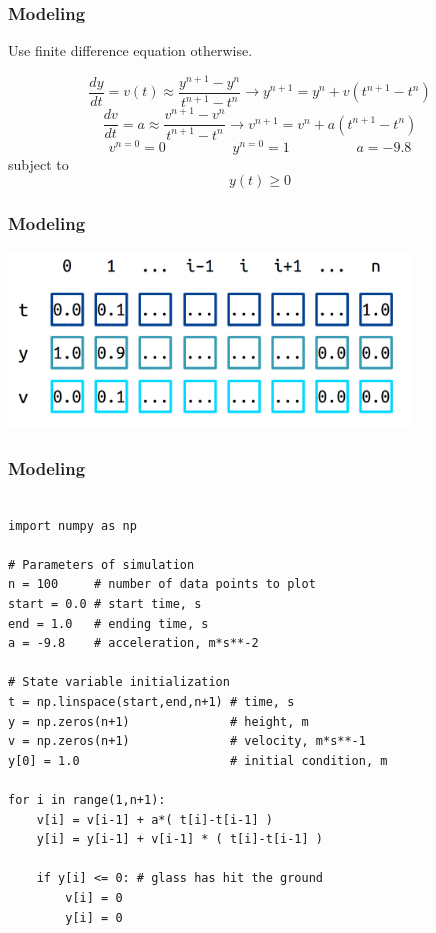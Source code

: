 \documentclass[11pt]{beamer}
\begin{document}
\begin{frame}[fragile]
  \frametitle{Modeling}
  \Enlarge

  \begin{enumerate}
  \myitem  Use finite difference equation otherwise.
  \end{enumerate}

$$
\frac{dy}{dt} = v(t) \approx \frac{y^{n+1} - y^{n}}{t^{n+1} - t^{n}} \rightarrow y^{n+1} = y^{n} + v \left( t^{n+1} - t^{n} \right)
$$
$$
\frac{dv}{dt} = a \approx \frac{v^{n+1} - v^{n}}{t^{n+1} - t^{n}} \rightarrow v^{n+1} = v^{n} + a \left( t^{n+1} - t^{n} \right)
$$
$$
v^{n=0} = 0
\hspace{2cm}
y^{n=0} = 1
\hspace{2cm}
a = -9.8
$$
subject to
$$
y(t) \geq 0
$$
\end{frame}

\begin{frame}[fragile]
  \frametitle{Modeling}
  \Enlarge

  \includegraphics[width=0.8\textwidth]{./img/arrays.png}
\end{frame}

\begingroup
\footnotesize
\begin{frame}[fragile]
  \frametitle{Modeling}

  \begin{Verbatim}

import numpy as np

# Parameters of simulation
n = 100     # number of data points to plot
start = 0.0 # start time, s
end = 1.0   # ending time, s
a = -9.8    # acceleration, m*s**-2

# State variable initialization
t = np.linspace(start,end,n+1) # time, s
y = np.zeros(n+1)              # height, m
v = np.zeros(n+1)              # velocity, m*s**-1
y[0] = 1.0                     # initial condition, m

for i in range(1,n+1):
    v[i] = v[i-1] + a*( t[i]-t[i-1] )
    y[i] = y[i-1] + v[i-1] * ( t[i]-t[i-1] )

    if y[i] <= 0: # glass has hit the ground
        v[i] = 0
        y[i] = 0
  \end{Verbatim}
\end{frame}
\endgroup
\end{document}
